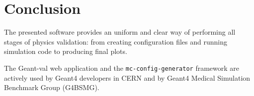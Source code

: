 \section{Conclusion}
\label{sec-status}

The presented software provides an uniform and clear way of performing all stages of physics validation: from creating configuration files and running simulation code to producing final plots.

The \textsf{Geant-val} web application and the {\tt mc-config-generator} framework are actively used by Geant4 developers in CERN and by Geant4 Medical Simulation Benchmark Group (G4BSMG).





